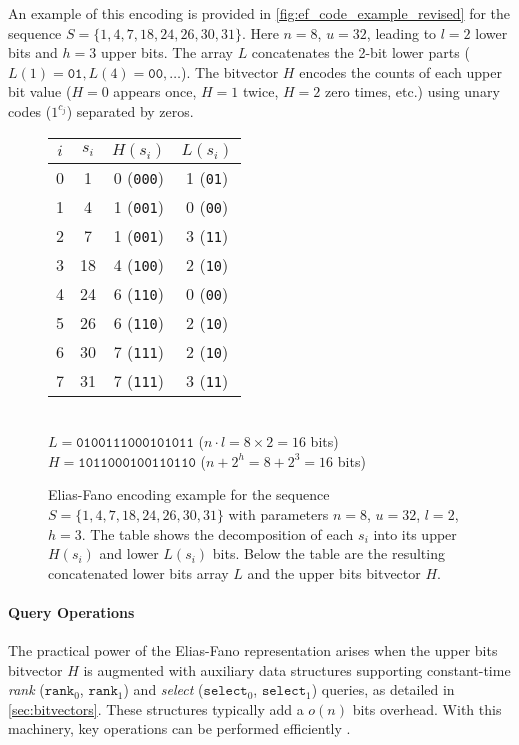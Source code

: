 An example of this encoding is provided in \autoref{fig:ef_code_example_revised} for the sequence $S = \{1, 4, 7, 18, 24, 26, 30, 31\}$. Here $n=8$, $u=32$, leading to $l=2$ lower bits and $h=3$ upper bits. The array $L$ concatenates the 2-bit lower parts ($L(1)=\texttt{01}, L(4)=\texttt{00}, \ldots$). The bitvector $H$ encodes the counts of each upper bit value ($H=0$ appears once, $H=1$ twice, $H=2$ zero times, etc.) using unary codes ($1^{c_j}$) separated by zeros.

\begin{figure}[hbtp]
    \centering
    \footnotesize
    \begin{tabular}{c | c | c c} \hline
        $i$ & $s_i$ & $H(s_i)$         & $L(s_i)$        \\ \hline
        0   & 1     & 0 (\texttt{000}) & 1 (\texttt{01}) \\
        1   & 4     & 1 (\texttt{001}) & 0 (\texttt{00}) \\
        2   & 7     & 1 (\texttt{001}) & 3 (\texttt{11}) \\
        3   & 18    & 4 (\texttt{100}) & 2 (\texttt{10}) \\
        4   & 24    & 6 (\texttt{110}) & 0 (\texttt{00}) \\
        5   & 26    & 6 (\texttt{110}) & 2 (\texttt{10}) \\
        6   & 30    & 7 (\texttt{111}) & 2 (\texttt{10}) \\
        7   & 31    & 7 (\texttt{111}) & 3 (\texttt{11}) \\ \hline
    \end{tabular} \\
    \vspace{0.5em}
    $L = \texttt{0100111000101011}$ ($n \cdot l = 8 \times 2 = 16$ bits) \\
    $H = \texttt{1011000100110110}$ ($n + 2^h = 8 + 2^3 = 16$ bits)
    \caption[Elias-Fano encoding example]{Elias-Fano encoding example for the sequence $S = \{1, 4, 7, 18, 24, 26, 30, 31\}$ with parameters $n=8$, $u=32$, $l=2$, $h=3$. The table shows the decomposition of each $s_i$ into its upper $H(s_i)$ and lower $L(s_i)$ bits. Below the table are the resulting concatenated lower bits array $L$ and the upper bits bitvector $H$.}
    \label{fig:ef_code_example_revised}
\end{figure}

\paragraph{Query Operations}
The practical power of the Elias-Fano representation arises when the upper bits bitvector $H$ is augmented with auxiliary data structures supporting constant-time \emph{rank} ($\texttt{rank}_0$, $\texttt{rank}_1$) and \emph{select} ($\texttt{select}_0$, $\texttt{select}_1$) queries, as detailed in \autoref{sec:bitvectors}. These structures typically add a $o(n)$ bits overhead. With this machinery, key operations can be performed efficiently \cite{sadakane2006squeezing,vigna2013quasi}.

